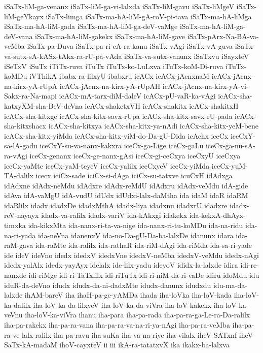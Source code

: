 {iSaTx-liM-ga-venanx
iSaTx-liM-ga-vi-lalxda
iSaTx-liM-gavu
iSaTx-liMgeV
iSaTx-liM-geYkayx
iSaTx-limga
iSaTx-ma-hA-liM-gA-roV-pi-tava
iSaTx-ma-hA-liMga
iSaTx-ma-hA-liM-gada
iSaTx-ma-hA-liM-ga-deV-vaMge
iSaTx-ma-hA-liM-ga-deV-vana
iSaTx-ma-hA-liM-gakekx
iSaTx-ma-hA-liM-gave
iSaTx-pArx-Na-BA-va-veMba
iSaTx-pa-Duva
iSaTx-pa-ri-cA-ra-kanu
iSaTx-vAgi
iSaTx-vA-guva
iSaTx-va-sutx-sA-kASx-tAkx-ra-rU-pa-vAda
iSaTx-va-sutx-vanunx
iSaTxvu
iSayxteV
iSeTxV
iSuTx
iTiTx-ruva
iTuTx
iTuTx-ko-LuLxva
iTuTx-koM-Di-ruva
iTuTx-koMDu
iVThikA
ibabx-ra-lilxyU
ibabxru
icACx
icACx-jAcnxnaM
icACx-jAcnx-na-kirx-yA-rUpA
icACx-jAcnx-na-kirx-yA-rUpAH
icACx-jAcnx-na-kirx-yA-vi-Sakx-ra-Na-mapi
icACx-mA-tarx-diM-daleV
icACx-pU-vaR-ka-vAgi
icACx-sha-katxyXM-sha-BeV-deVna
icACx-shaketxVH
icACx-shakitx
icACx-shakitxH
icACx-sha-kitxge
icACx-sha-kitx-savx-rUpa
icACx-sha-kitx-savx-rU-pada
icACx-sha-kitxshacx
icACx-sha-kitxya
icACx-sha-kitx-ya-nAdi
icACx-sha-kitx-yeM-bene
icACx-sha-kitx-yiMda
icACx-sha-kitx-yiM-do-Da-gU-Dida
icAchx
iceCx
iceCxY-sa-lA-gadu
iceCxY-su-va-nanx-kakxra
iceCx-ga-Lige
iceCx-gaLu
iceCx-ga-nu-sA-ra-vAgi
iceCx-genanx
iceCx-ge-nanx-gAsi
iceCx-gi-ceCxya
iceCxyU
iceCxya
iceCx-yaMte
iceCx-yaM-teyeV
iceCx-yalilx
iceCxyeV
iceCx-yiMda
iceCx-yuM-TA-dalilx
icecx
iciCx-sade
iciCx-si-dAga
iciCx-su-tatxve
icuCxH
idAdxga
idAdxne
idAdx-neMdu
idAdxre
idAdx-reMdU
idAdxru
idAdx-veMdu
idA-gide
idAva
idA-vaMgU
idA-vudU
idUdx
idUdxi-lalx-daMtha
ida
idaM
idaR
idaRM
idaRlilx
idadx
idadxDe
idadxMthA
idadx-liya
idadxnu
idadxrU
idadxre
idadx-reV-nayayx
idadx-va-ralilx
idadx-variV
ida-kAkxgi
idakekx
ida-kekxA-dhAyx-timxka
ida-kikxMta
ida-nanx-ri-ta-va-nige
ida-nanx-ri-tu-koMDu
ida-na-ridu
ida-na-ri-yada
ida-neVna
idanenxV
ida-no-Da-gU-Da-ba-lalxDe
idanunx
idara
ida-raM-gava
ida-raMte
ida-ralilx
ida-rathaR
ida-riM-dAgi
ida-riMda
ida-sa-ri-yade
ide
ideV
ideVno
idedx
idedxV
idedxVne
idedxV-neMba
idedxV-veMdu
idedx-nAgi
idedx-yalAlx
idedx-yayAyx
idelalx
ide-lilx-yadu
ideyoV
ididx-la-lalxde
idira
idi-re-nanxde
idi-riMge
idi-ri-TaTxlilx
idi-riTuTx
idi-ri-niM-da-ri-vaDe
idiru
idoMdu
idu
iduR-da-deVno
idudx
idudx-da-ni-dadxMte
idudx-danunx
idudxdu
idu-ma-da-lalxde
ihAM-bareV
iha
ihaH-pa-ge-yAMDa
ihada
iha-loVka
iha-loV-kada
iha-loV-ka-dalilx
iha-loV-ka-da-lilxyeV
iha-loV-ka-da-viVra
iha-loV-kakekx
iha-loV-ka-veVnu
iha-loV-ka-viVra
ihanu
iha-para
iha-pa-rada
iha-pa-ra-ga-Le-ra-Da-ralilx
iha-pa-rakekx
iha-pa-ra-vana
iha-pa-ra-va-na-ri-ya-nAgi
iha-pa-ra-veMba
iha-pa-ra-ve-lalx-ralilx
iha-pa-ravu
iha-suKa
iha-va-na-riye
iha-vilalx
iheV-SATxnf
iheV-SaTx-kA-madaM
ihoV-cayxteV
ii
iii
ikA-ra-tatatxvX
ika
ikakx-ba-lalxva
}
